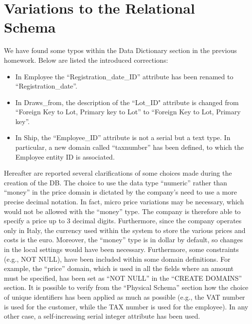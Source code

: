 \section{Variations to the Relational Schema}


We have found some typos within the Data Dictionary section in the previous homework. Below are listed the introduced corrections:
\begin{itemize}
	\item In Employee the ``Registration\_date\_ID'' attribute has been renamed to ``Registration\_date''.
	\item In Draws\_from, the description of the ``Lot\_ID" attribute is changed from ``Foreign Key to Lot, Primary key to Lot'' to ``Foreign Key to Lot, Primary key''.
	\item In Ship, the ``Employee\_ID'' attribute is not a serial but a text type. In particular, a new domain called ``taxnumber'' has been defined, to which the Employee entity ID is associated.
\end{itemize}

\noindent Hereafter are reported several clarifications of some choices made during the creation of the DB. The choice to use the data type ``numeric'' rather than ``money'' in the price domain is dictated by the company's need to use a more precise decimal notation. In fact, micro price variations may be necessary, which would not be allowed with the ``money'' type. The company is therefore able to specify a price up to 3 decimal digits. Furthermore, since the company operates only in Italy, the currency used within the system to store the various prices and costs is the euro. Moreover, the ``money'' type is in dollar by default, so changes in the local settings would have been necessary. Furthermore, some constraints (e.g., NOT NULL), have been included within some domain definitions. For example, the ``price'' domain, which is used in all the fields where an amount must be specified, has been set as ``NOT NULL'' in the ``CREATE DOMAINS'' section. It is possible to verify from the ``Physical Schema'' section how the choice of unique identifiers has been applied as much as possible (e.g., the VAT number is used for the customer, while the TAX number is used for the employee). In any other case, a self-increasing serial integer attribute has been used.